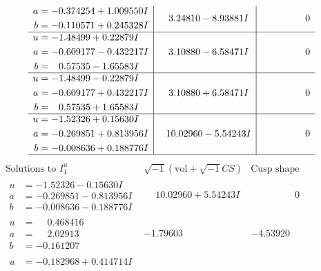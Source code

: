\documentclass[1p]{elsarticle_modified}
\theoremstyle{definition}
\newcommand{\I}{\sqrt{-1}}
\begin{document}
$$\begin{array}{c|c|c}
\begin{aligned}
a &= -0.374254 + 1.009550 I \\
b &= -0.110571 + 0.245328 I\end{aligned}
 & \phantom{-}3.24810 - 8.93881 I & \phantom{-0.000000 } 0 \\ \hline\begin{aligned}
u &= -1.48499 + 0.22879 I \\
a &= -0.609177 - 0.432217 I \\
b &= \phantom{-}0.57535 - 1.65583 I\end{aligned}
 & \phantom{-}3.10880 - 6.58471 I & \phantom{-0.000000 } 0 \\ \hline\begin{aligned}
u &= -1.48499 - 0.22879 I \\
a &= -0.609177 + 0.432217 I \\
b &= \phantom{-}0.57535 + 1.65583 I\end{aligned}
 & \phantom{-}3.10880 + 6.58471 I & \phantom{-0.000000 } 0 \\ \hline\begin{aligned}
u &= -1.52326 + 0.15630 I \\
a &= -0.269851 + 0.813956 I \\
b &= -0.008636 + 0.188776 I\end{aligned}
 & \phantom{-}10.02960 - 5.54243 I & \phantom{-0.000000 } 0\\
 \hline 
 \end{array}$$\newpage$$\begin{array}{c|c|c}  
\text{Solutions to }I^u_{1}& \I (\text{vol} + \sqrt{-1}CS) & \text{Cusp shape}\\
 \hline 
\begin{aligned}
u &= -1.52326 - 0.15630 I \\
a &= -0.269851 - 0.813956 I \\
b &= -0.008636 - 0.188776 I\end{aligned}
 & \phantom{-}10.02960 + 5.54243 I & \phantom{-0.000000 } 0 \\ \hline\begin{aligned}
u &= \phantom{-}0.468416\phantom{ +0.000000I} \\
a &= \phantom{-}2.02913\phantom{ +0.000000I} \\
b &= -0.161207\phantom{ +0.000000I}\end{aligned}
 & -1.79603\phantom{ +0.000000I} & -4.53920\phantom{ +0.000000I} \\ \hline\begin{aligned}
u &= -0.182968 + 0.414714 I \\

\end{aligned}
\end{array}$$
\end{document}
